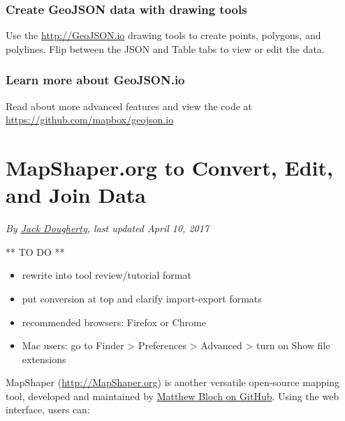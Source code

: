 \documentclass[
  english,
]{book}
\providecommand{\tightlist}{%
  \setlength{\itemsep}{0pt}\setlength{\parskip}{0pt}}
\begin{document}
\hypertarget{create-geojson-data-with-drawing-tools}{%
\subsubsection*{Create GeoJSON data with drawing tools}\label{create-geojson-data-with-drawing-tools}}

Use the \url{http://GeoJSON.io} drawing tools to create points, polygons, and polylines. Flip between the JSON and Table tabs to view or edit the data.

\hypertarget{learn-more-about-geojson.io}{%
\subsubsection*{Learn more about GeoJSON.io}\label{learn-more-about-geojson.io}}

Read about more advanced features and view the code at \url{https://github.com/mapbox/geojson.io}

\hypertarget{mapshaper.org-to-convert-edit-and-join-data}{%
\section*{MapShaper.org to Convert, Edit, and Join Data}\label{mapshaper.org-to-convert-edit-and-join-data}}

\emph{By \href{authors}{Jack Dougherty}, last updated April 10, 2017}

** TO DO **

\begin{itemize}
\tightlist
\item
  rewrite into tool review/tutorial format
\item
  put conversion at top and clarify import-export formats
\item
  recommended browsers: Firefox or Chrome
\item
  Mac users: go to Finder \textgreater{} Preferences \textgreater{} Advanced \textgreater{} turn on Show file extensions
\end{itemize}

MapShaper (\url{http://MapShaper.org}) is another versatile open-source mapping tool, developed and maintained by \href{https://github.com/mbloch/mapshaper}{Matthew Bloch on GitHub}. Using the web interface, users can:
\end{document}
